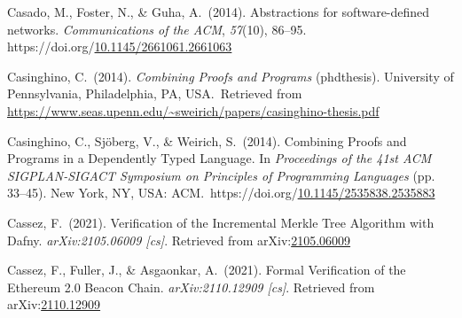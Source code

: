 \documentclass[12pt,twoside]{article}
\begin{document}
{\begin{thebibliography}{1079}
\mdbibitemlabel{}Casado, M., Foster, N., \& Guha, A.~(2014). Abstractions for software-defined networks. \emph{Communications of the ACM}, \emph{57}(10), 86–95. https://doi.org/\href{https://dx.doi.org/10.1145/2661061.2661063}{10.1145/2661061.2661063}%

\mdbibitemlabel{}Casinghino, C.~(2014). \emph{Combining Proofs and Programs} (phdthesis). University of Pennsylvania, Philadelphia, PA, USA.~Retrieved from \href{https://www.seas.upenn.edu/~sweirich/papers/casinghino-thesis.pdf}{{\ttfamily https://\hspace{0pt}www.\hspace{0pt}seas.\hspace{0pt}upenn.\hspace{0pt}edu/\hspace{0pt}\textasciitilde{}sweirich/\hspace{0pt}papers/\hspace{0pt}casinghino-\hspace{0pt}thesis.\hspace{0pt}pdf}}%

\mdbibitemlabel{}Casinghino, C., Sjöberg, V., \& Weirich, S.~(2014). Combining Proofs and Programs in a Dependently Typed Language. In \emph{Proceedings of the 41st ACM SIGPLAN-SIGACT Symposium on Principles of Programming Languages} (pp. 33–45). New York, NY, USA: ACM.~https://doi.org/\href{https://dx.doi.org/10.1145/2535838.2535883}{10.1145/2535838.2535883}%

\mdbibitemlabel{}Cassez, F.~(2021). Verification of the Incremental Merkle Tree Algorithm with Dafny. \emph{arXiv:2105.06009 {}[cs]}. Retrieved from arXiv:\href{http://arxiv.org/abs/2105.06009}{2105.06009}%

\mdbibitemlabel{}Cassez, F., Fuller, J., \& Asgaonkar, A.~(2021). Formal Verification of the Ethereum 2.0 Beacon Chain. \emph{arXiv:2110.12909 {}[cs]}. Retrieved from arXiv:\href{http://arxiv.org/abs/2110.12909}{2110.12909}%


\end{thebibliography}}
\end{document}
